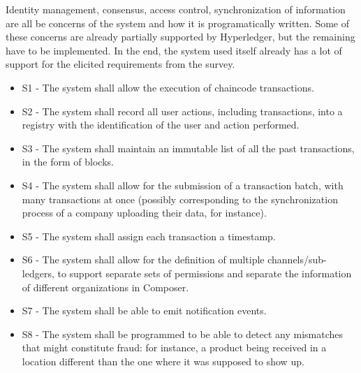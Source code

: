 		Identity management, consensus, access control, synchronization of information are all be concerns of the system and how it is programatically written. Some of these concerns are already partially supported by Hyperledger, but the remaining have to be implemented. In the end, the system used itself already has a lot of support for the elicited requirements from the survey.
		\begin{itemize}
			\item S1 - The system shall allow the execution of chaincode transactions.
			\item S2 - The system shall record all user actions, including transactions, into a registry with the identification of the user and action performed. %
			\item S3 - The system shall maintain an immutable list of all the past transactions, in the form of blocks.
			\item S4 - The system shall allow for the submission of a transaction batch, with many transactions at once (possibly corresponding to the synchronization process of a company uploading their data, for instance).
			\item S5 - The system shall assign each transaction a timestamp.
			\item S6 - The system shall allow for the definition of multiple channels/sub-ledgers, to support separate sets of permissions and separate the information of different organizations in Composer.%
			\item S7 - The system shall be able to emit notification events.
			\item S8 - The system shall be programmed to be able to detect any mismatches that might constitute fraud: for instance, a product being received in a location different than the one where it was supposed to show up.

\end{itemize}
